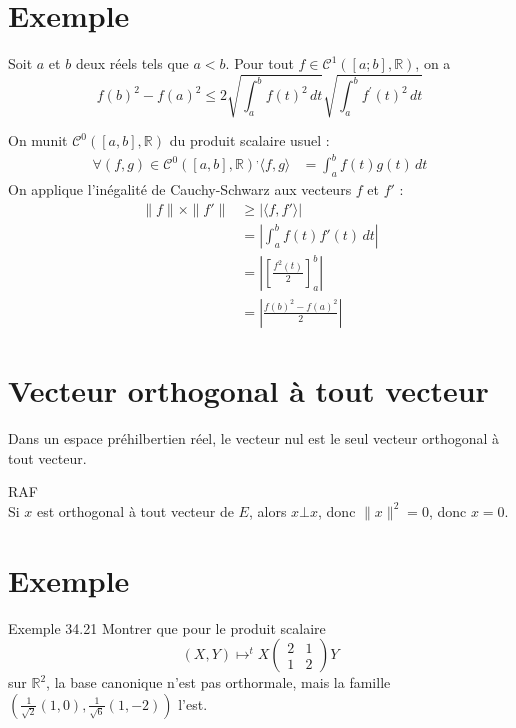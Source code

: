 \documentclass[../main.tex]{subfiles}
\begin{document}
\section{Exemple}
\begin{tcolorbox}[title=Exemple 34.18, title filled=false, colframe=darkgreen, colback=darkgreen!10!white]
    Soit $a$ et $b$ deux réels tels que $a<b$. Pour tout $f \in \mathcal{C}^1([a ; b], \mathbb{R})$, on a
    $$f(b)^2-f(a)^2 \leq 2 \sqrt{\int_a^b f(t)^2 \,dt} \sqrt{\int_a^b f^{\prime}(t)^2 \,dt}$$
\end{tcolorbox}

\noindent On munit $\mathcal{C}^0([a, b], \mathbb{R})$ du produit scalaire usuel : 
\begin{align*}
    \forall (f, g)\in \mathcal{C}^0([a, b], \mathbb{R})^, \langle f, g \rangle &= \int_{a}^{b} f(t) g(t) \,dt
\end{align*}
On applique l'inégalité de Cauchy-Schwarz aux vecteurs $f$ et $f'$ : 
\begin{align*}
    \|f\|\times \|f'\| &\geq |\langle f, f'\rangle| \\
    &= \left| \int_{a}^{b} f(t) f'(t) \,dt \right| \\
    &= \left| \left[ \frac{f^2(t)}{2} \right]_a^b \right| \\
    &= \left|  \frac{f(b)^2 - f(a)^2}{2} \right|
\end{align*}

\section{Vecteur orthogonal à tout vecteur}
\begin{tcolorbox}[title=Théorème 34.20, title filled=false, colframe=orange, colback=orange!10!white]
    Dans un espace préhilbertien réel, le vecteur nul est le seul vecteur orthogonal à tout vecteur. 
\end{tcolorbox}

\indent \boxed{\Rightarrow} RAF \\
\indent \boxed{\Leftarrow} Si $x$ est orthogonal à tout vecteur de $E$, alors $x\bot x$, donc $\|x\|^2 = 0$, donc $x = 0$. 

\section{Exemple}
\begin{tcolorbox}[title=Exemple 34.21, title filled=false, colframe=darkgreen, colback=darkgreen!10!white]
    Exemple 34.21 Montrer que pour le produit scalaire
    $$
(X, Y) \mapsto^t X\begin{pmatrix}
    2 & 1 \\
    1 & 2
    \end{pmatrix} Y
    $$
    sur $\mathbb{R}^2$, la base canonique n'est pas orthormale, mais la famille $\left(\frac{1}{\sqrt{2}}(1,0), \frac{1}{\sqrt{6}}(1,-2)\right)$ l'est.
\end{tcolorbox}
\end{document}
